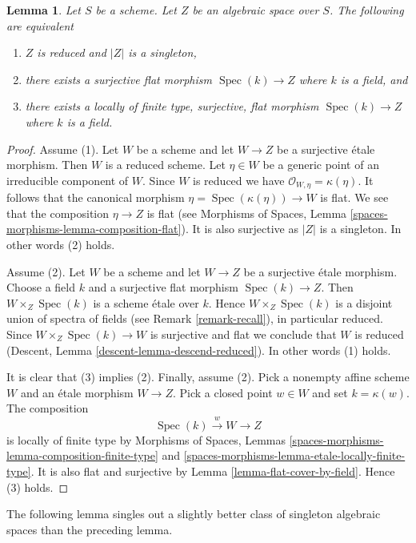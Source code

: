 \documentclass{stacks-project}
\theoremstyle{plain}
\newtheorem{lemma}[subsection]{Lemma}
\theoremstyle{definition}
\theoremstyle{remark}
\numberwithin{equation}{subsection}
\def\Spec{\mathop{\mathrm{Spec}}}
\begin{document}
\begin{lemma}
\label{lemma-unique-point}
Let $S$ be a scheme.
Let $Z$ be an algebraic space over $S$. The following are equivalent
\begin{enumerate}
\item $Z$ is reduced and $|Z|$ is a singleton,
\item there exists a surjective flat morphism $\Spec(k) \to Z$
where $k$ is a field, and
\item there exists a locally of finite type, surjective, flat morphism
$\Spec(k) \to Z$ where $k$ is a field.
\end{enumerate}
\end{lemma}

\begin{proof}
Assume (1). Let $W$ be a scheme and
let $W \to Z$ be a surjective \'etale morphism. Then $W$ is
a reduced scheme. Let $\eta \in W$ be a generic point of an irreducible
component of $W$. Since $W$ is reduced we have
$\mathcal{O}_{W, \eta} = \kappa(\eta)$. It follows that the canonical
morphism $\eta = \Spec(\kappa(\eta)) \to W$ is flat. We see that the
composition $\eta \to Z$ is flat (see
Morphisms of Spaces, Lemma \ref{spaces-morphisms-lemma-composition-flat}).
It is also surjective as $|Z|$ is a singleton. In other words
(2) holds.

\medskip\noindent
Assume (2). Let $W$ be a scheme and
let $W \to Z$ be a surjective \'etale morphism. Choose a field
$k$ and a surjective flat morphism $\Spec(k) \to Z$.
Then $W \times_Z \Spec(k)$ is a scheme \'etale over $k$.
Hence $W \times_Z \Spec(k)$ is a disjoint union of spectra of fields
(see Remark \ref{remark-recall}), in particular reduced. Since
$W \times_Z \Spec(k) \to W$
is surjective and flat we conclude that $W$ is reduced
(Descent, Lemma \ref{descent-lemma-descend-reduced}).
In other words (1) holds.

\medskip\noindent
It is clear that (3) implies (2). Finally, assume (2). Pick a nonempty
affine scheme $W$ and an \'etale morphism $W \to Z$. Pick a closed
point $w \in W$ and set $k = \kappa(w)$. The composition
$$
\Spec(k) \xrightarrow{w} W \longrightarrow Z
$$
is locally of finite type by
Morphisms of Spaces, Lemmas
\ref{spaces-morphisms-lemma-composition-finite-type} and
\ref{spaces-morphisms-lemma-etale-locally-finite-type}.
It is also flat and surjective by
Lemma \ref{lemma-flat-cover-by-field}.
Hence (3) holds.
\end{proof}

\noindent
The following lemma singles out a slightly better class of singleton
algebraic spaces than the preceding lemma.
\end{document}
